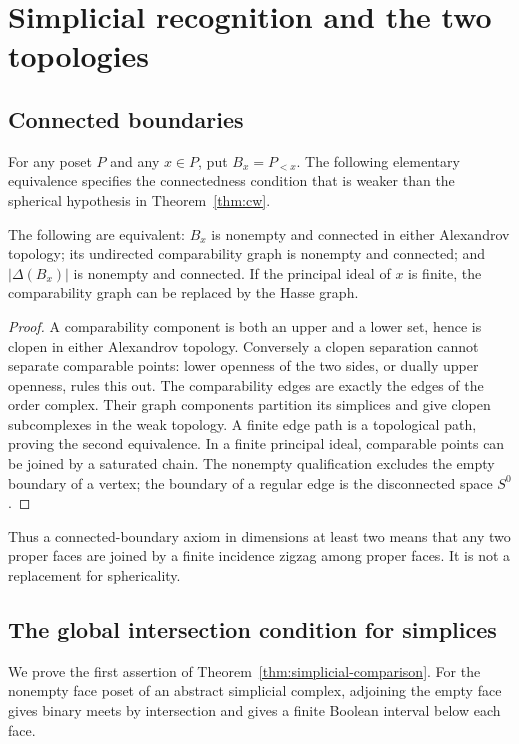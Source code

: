 \section{Simplicial recognition and the two topologies}
\label{sec:simplicial-comparison}

\subsection{Connected boundaries}
For any poset $P$ and any $x\in P$, put $B_x=P_{<x}$.
The following elementary equivalence specifies the connectedness
condition that is weaker than the spherical hypothesis in
Theorem~\ref{thm:cw}.

\begin{proposition}\label{prop:boundary-connected}
The following are equivalent: $B_x$ is nonempty and connected
in either Alexandrov topology; its undirected comparability graph
is nonempty and connected; and $|\Delta(B_x)|$ is nonempty and
connected. If the principal ideal of $x$ is finite, the
comparability graph can be replaced by the Hasse graph.
\end{proposition}
\begin{proof}
A comparability component is both an upper and a lower set, hence
is clopen in either Alexandrov topology. Conversely a clopen
separation cannot separate comparable points: lower openness
of the two sides, or dually upper openness, rules this out.
The comparability edges are exactly the edges of the order
complex. Their graph components partition its simplices and give
clopen subcomplexes in the weak topology. A finite edge path is
a topological path, proving the second equivalence. In a finite
principal ideal, comparable points can be joined by a saturated
chain. The nonempty qualification excludes the empty boundary of
a vertex; the boundary of a regular edge is the disconnected
space $S^0$.
\end{proof}
Thus a connected-boundary axiom in dimensions at least two means
that any two proper faces are joined by a finite incidence zigzag
among proper faces. It is not a replacement for sphericality.

\subsection{The global intersection condition for simplices}
We prove the first assertion of
Theorem~\ref{thm:simplicial-comparison}. For the nonempty face
poset of an abstract simplicial complex, adjoining the empty face
gives binary meets by intersection and gives a finite Boolean
interval below each face.

